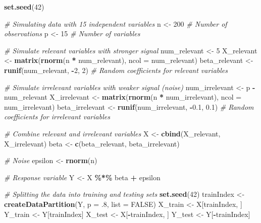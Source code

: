 \documentclass[
]{article}
\newenvironment{Shaded}{\begin{snugshade}}{\end{snugshade}}
\newcommand{\AttributeTok}[1]{\textcolor[rgb]{0.13,0.29,0.53}{#1}}
\newcommand{\CommentTok}[1]{\textcolor[rgb]{0.56,0.35,0.01}{\textit{#1}}}
\newcommand{\ConstantTok}[1]{\textcolor[rgb]{0.56,0.35,0.01}{#1}}
\newcommand{\DecValTok}[1]{\textcolor[rgb]{0.00,0.00,0.81}{#1}}
\newcommand{\FloatTok}[1]{\textcolor[rgb]{0.00,0.00,0.81}{#1}}
\newcommand{\FunctionTok}[1]{\textcolor[rgb]{0.13,0.29,0.53}{\textbf{#1}}}
\newcommand{\NormalTok}[1]{#1}
\newcommand{\OtherTok}[1]{\textcolor[rgb]{0.56,0.35,0.01}{#1}}
\newcommand{\SpecialCharTok}[1]{\textcolor[rgb]{0.81,0.36,0.00}{\textbf{#1}}}
\begin{document}
\begin{Shaded}
\begin{Highlighting}[]
\FunctionTok{set.seed}\NormalTok{(}\DecValTok{42}\NormalTok{)}

\CommentTok{\# Simulating data with 15 independent variables}
\NormalTok{n }\OtherTok{\textless{}{-}} \DecValTok{200} \CommentTok{\# Number of observations}
\NormalTok{p }\OtherTok{\textless{}{-}} \DecValTok{15} \CommentTok{\# Number of variables}

\CommentTok{\# Simulate relevant variables with stronger signal}
\NormalTok{num\_relevant }\OtherTok{\textless{}{-}} \DecValTok{5}
\NormalTok{X\_relevant }\OtherTok{\textless{}{-}} \FunctionTok{matrix}\NormalTok{(}\FunctionTok{rnorm}\NormalTok{(n }\SpecialCharTok{*}\NormalTok{ num\_relevant), }\AttributeTok{ncol =}\NormalTok{ num\_relevant)}
\NormalTok{beta\_relevant }\OtherTok{\textless{}{-}} \FunctionTok{runif}\NormalTok{(num\_relevant, }\SpecialCharTok{{-}}\DecValTok{2}\NormalTok{, }\DecValTok{2}\NormalTok{) }\CommentTok{\# Random coefficients for relevant variables}

\CommentTok{\# Simulate irrelevant variables with weaker signal (noise)}
\NormalTok{num\_irrelevant }\OtherTok{\textless{}{-}}\NormalTok{ p }\SpecialCharTok{{-}}\NormalTok{ num\_relevant}
\NormalTok{X\_irrelevant }\OtherTok{\textless{}{-}} \FunctionTok{matrix}\NormalTok{(}\FunctionTok{rnorm}\NormalTok{(n }\SpecialCharTok{*}\NormalTok{ num\_irrelevant), }\AttributeTok{ncol =}\NormalTok{ num\_irrelevant)}
\NormalTok{beta\_irrelevant }\OtherTok{\textless{}{-}} \FunctionTok{runif}\NormalTok{(num\_irrelevant, }\SpecialCharTok{{-}}\FloatTok{0.1}\NormalTok{, }\FloatTok{0.1}\NormalTok{) }\CommentTok{\# Random coefficients for irrelevant variables}

\CommentTok{\# Combine relevant and irrelevant variables}
\NormalTok{X }\OtherTok{\textless{}{-}} \FunctionTok{cbind}\NormalTok{(X\_relevant, X\_irrelevant)}
\NormalTok{beta }\OtherTok{\textless{}{-}} \FunctionTok{c}\NormalTok{(beta\_relevant, beta\_irrelevant)}

\CommentTok{\# Noise}
\NormalTok{epsilon }\OtherTok{\textless{}{-}} \FunctionTok{rnorm}\NormalTok{(n)}

\CommentTok{\# Response variable}
\NormalTok{Y }\OtherTok{\textless{}{-}}\NormalTok{ X }\SpecialCharTok{\%*\%}\NormalTok{ beta }\SpecialCharTok{+}\NormalTok{ epsilon}

\CommentTok{\# Splitting the data into training and testing sets}
\FunctionTok{set.seed}\NormalTok{(}\DecValTok{42}\NormalTok{)}
\NormalTok{trainIndex }\OtherTok{\textless{}{-}} \FunctionTok{createDataPartition}\NormalTok{(Y, }\AttributeTok{p =}\NormalTok{ .}\DecValTok{8}\NormalTok{, }\AttributeTok{list =} \ConstantTok{FALSE}\NormalTok{)}
\NormalTok{X\_train }\OtherTok{\textless{}{-}}\NormalTok{ X[trainIndex, ]}
\NormalTok{Y\_train }\OtherTok{\textless{}{-}}\NormalTok{ Y[trainIndex]}
\NormalTok{X\_test }\OtherTok{\textless{}{-}}\NormalTok{ X[}\SpecialCharTok{{-}}\NormalTok{trainIndex, ]}
\NormalTok{Y\_test }\OtherTok{\textless{}{-}}\NormalTok{ Y[}\SpecialCharTok{{-}}\NormalTok{trainIndex]}


\end{Highlighting}
\end{Shaded}
\end{document}

